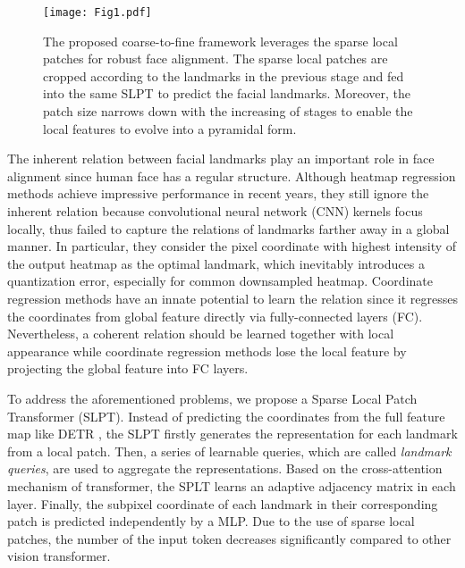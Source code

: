 \documentclass[10pt,twocolumn,letterpaper]{article}
\begin{document}
\begin{figure}[t!]
	\centering
	\texttt{[image: Fig1.pdf]}
	\caption{The proposed coarse-to-fine framework leverages the sparse local patches for robust face alignment. The sparse local patches are cropped according to the landmarks in the previous stage and fed into the same SLPT to predict the facial landmarks. Moreover, the patch size narrows down with the increasing of stages to enable the local features to evolve into a pyramidal form.}
	\label{fig1}
\end{figure}

The inherent relation between facial landmarks play an important role in face alignment since human face has a regular structure. Although heatmap regression methods achieve impressive performance \cite{MOHP, LUVLI, Awing, DeCaFA, HRnet} in recent years, they still ignore the inherent relation because convolutional neural network (CNN) kernels focus locally, thus failed to capture the relations of landmarks farther away in a global manner. In particular, they consider the pixel coordinate with highest intensity of the output heatmap as the optimal landmark, which inevitably introduces a quantization error, especially for common downsampled heatmap. Coordinate regression methods \cite{SCDF, SAN, Wing, TCDNN, LAB, DVLN, SRT} have an innate potential to learn the relation since it regresses the coordinates from global feature directly via fully-connected layers (FC). Nevertheless, a coherent relation should be learned together with local appearance while coordinate regression methods lose the local feature by projecting the global feature into FC layers.





To address the aforementioned problems, we propose a Sparse Local Patch Transformer (SLPT). Instead of predicting the coordinates from the full feature map like DETR \cite{DETR}, the SLPT firstly generates the representation for each landmark from a local patch. Then, a series of learnable queries, which are called \textit{landmark queries}, are used to aggregate the representations. Based on the cross-attention mechanism of transformer, the SPLT learns an adaptive adjacency matrix in each layer. Finally, the subpixel coordinate of each landmark in their corresponding patch is predicted independently by a MLP. Due to the use of sparse local patches, the number of the input token decreases significantly compared to other vision transformer\cite{DETR, VIT}.
\end{document}
